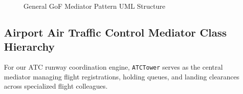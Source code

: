 \documentclass[12pt,a4paper]{article}
\begin{document}
\begin{figure}[htbp]
{
}
\caption{General GoF Mediator Pattern UML Structure}
\label{fig:general_mediator_uml}
\end{figure}

\subsection{Airport Air Traffic Control Mediator Class Hierarchy}
For our ATC runway coordination engine, \texttt{ATCTower} serves as the central mediator managing flight registrations, holding queues, and landing clearances across specialized flight colleagues.
\end{document}
